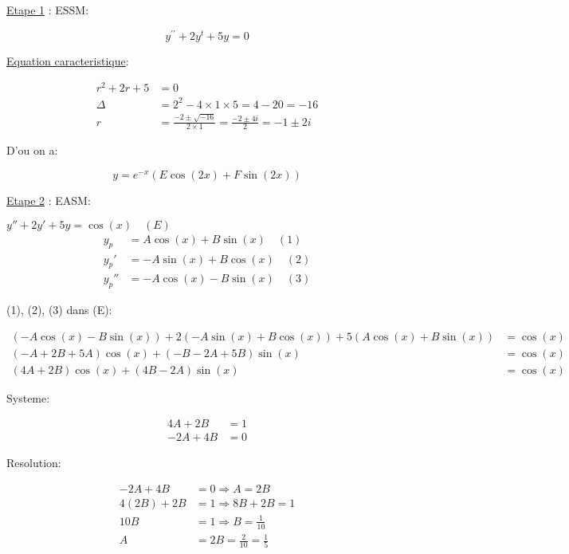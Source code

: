 \underline{Etape 1} : ESSM:

$$
y^{\prime \prime} + 2 y^t + 5 y = 0
$$

\underline{Equation caracteristique}:

\[
\begin{aligned}
    r^2 + 2r + 5 &= 0 \\
    \Delta &= 2^2 - 4 \times 1 \times 5 = 4 - 20 = -16 \\
    r &= \frac{-2 \pm \sqrt{-16}}{2 \times 1} = \frac{-2 \pm 4i}{2} = -1 \pm 2i
\end{aligned}
\]

D'ou on a:

$$
y = e^{-x} (E \cos (2x) + F \sin (2x))
$$

\underline{Etape 2} : EASM:

$y'' + 2y' + 5y = \cos (x) \quad (E)$ \\

\[
\begin{aligned}
    y_p &= A \cos (x) + B \sin (x) \quad (1) \\
    y_p' &= -A \sin (x) + B \cos (x) \quad (2) \\
    y_p'' &= -A \cos (x) - B \sin (x) \quad (3)
\end{aligned}
\]

(1), (2), (3) dans (E):

\[
\begin{aligned}
    (-A \cos (x) - B \sin (x)) + 2(-A \sin (x) + B \cos (x)) + 5(A \cos (x) + B \sin (x)) &= \cos (x) \\
    (-A + 2B + 5A) \cos (x) + (-B - 2A + 5B) \sin (x) &= \cos (x) \\
    (4A + 2B) \cos (x) + (4B - 2A) \sin (x) &= \cos (x)
\end{aligned}
\]

Systeme:

\[
\begin{aligned}
    4A + 2B &= 1 \\
   -2A + 4B &= 0
\end{aligned}
\]

Resolution:

\[
\begin{aligned}
    -2A + 4B &= 0 \Rightarrow A = 2B \\
    4(2B) + 2B &= 1 \Rightarrow 8B + 2B = 1 \\
    10B &= 1 \Rightarrow B = \frac{1}{10} \\
    A &= 2B = \frac{2}{10} = \frac{1}{5}
\end{aligned}
\]

